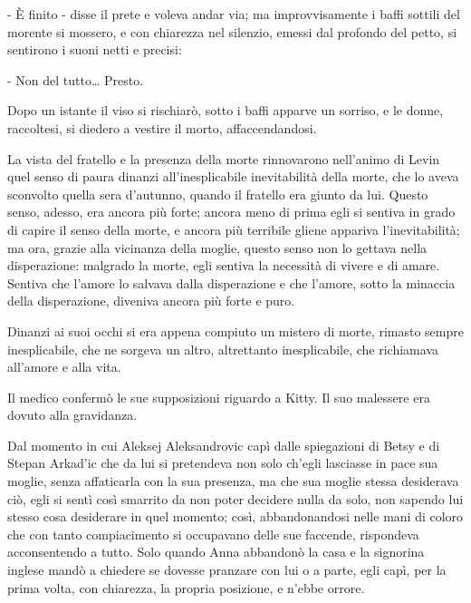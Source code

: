 - È finito - disse il prete e voleva andar via; ma improvvisamente i baffi sottili del morente si mossero, e con chiarezza nel silenzio, emessi dal profondo del petto, si sentirono i suoni netti e precisi: 

- Non del tutto\ldots{} Presto. 

Dopo un istante il viso si rischiarò, sotto i baffi apparve un sorriso, e le donne, raccoltesi, si diedero a vestire il morto, affaccendandosi. 

La vista del fratello e la presenza della morte rinnovarono nell'animo di Levin quel senso di paura dinanzi all'inesplicabile inevitabilità della morte, che lo aveva sconvolto quella sera d'autunno, quando il fratello era giunto da lui. Questo senso, adesso, era ancora più forte; ancora meno di prima egli si sentiva in grado di capire il senso della morte, e ancora più terribile gliene appariva l'inevitabilità; ma ora, grazie alla vicinanza della moglie, questo senso non lo gettava nella disperazione: malgrado la morte, egli sentiva la necessità di vivere e di amare. Sentiva che l'amore lo salvava dalla disperazione e che l'amore, sotto la minaccia della disperazione, diveniva ancora più forte e puro. 

Dinanzi ai suoi occhi si era appena compiuto un mistero di morte, rimasto sempre inesplicabile, che ne sorgeva un altro, altrettanto inesplicabile, che richiamava all'amore e alla vita. 

Il medico confermò le sue supposizioni riguardo a Kitty. Il suo malessere era dovuto alla gravidanza. 

\label{xxi-4} 

Dal momento in cui Aleksej Aleksandrovic capì dalle spiegazioni di Betsy e di Stepan Arkad'ic che da lui si pretendeva non solo ch'egli lasciasse in pace sua moglie, senza affaticarla con la sua presenza, ma che sua moglie stessa desiderava ciò, egli si sentì così smarrito da non poter decidere nulla da solo, non sapendo lui stesso cosa desiderare in quel momento; così, abbandonandosi nelle mani di coloro che con tanto compiacimento si occupavano delle sue faccende, rispondeva acconsentendo a tutto. Solo quando Anna abbandonò la casa e la signorina inglese mandò a chiedere se dovesse pranzare con lui o a parte, egli capì, per la prima volta, con chiarezza, la propria posizione, e n'ebbe orrore. 


